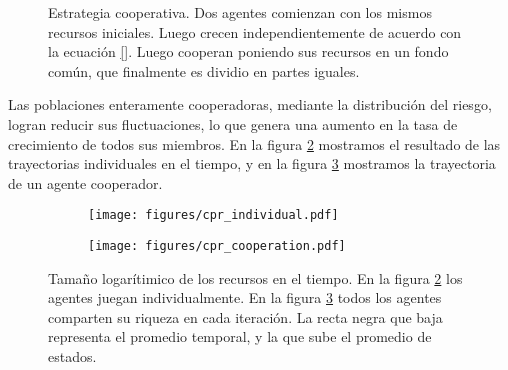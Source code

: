 \documentclass[a4paper,10pt]{article}
\begin{document}
\begin{figure}[H]
\centering
{}
\caption{Estrategia cooperativa. Dos agentes comienzan con los mismos recursos iniciales. Luego crecen independientemente de acuerdo con la ecuaci\'on \ref{}. Luego cooperan poniendo sus recursos en un fondo común, que finalmente es dividio en partes iguales.}
\label{fig:protocolo}
\end{figure}

Las poblaciones enteramente cooperadoras, mediante la distribución del riesgo, logran reducir sus fluctuaciones, lo que genera una aumento en la tasa de crecimiento de todos sus miembros.
En la figura \ref{fig:cpr_individual} mostramos el resultado de las trayectorias individuales en el tiempo, y en la figura \ref{fig:cpr_cooperation} mostramos la trayectoria de un agente cooperador.
\begin{figure}[ht!]
    \centering
    \begin{subfigure}[b]{0.45\textwidth}
    \texttt{[image: figures/cpr\_individual.pdf]}
    \caption{}
    \label{fig:cpr_individual}
    \end{subfigure}
    \begin{subfigure}[b]{0.45\textwidth}
    \texttt{[image: figures/cpr\_cooperation.pdf]}
    \caption{}
    \label{fig:cpr_cooperation}
    \end{subfigure}
    \caption{
    Tamaño logarítimico de los recursos en el tiempo.
    En la figura \ref{fig:cpr_individual} los agentes juegan individualmente.
    En la figura \ref{fig:cpr_cooperation} todos los agentes comparten su riqueza en cada iteración.
    La recta negra que baja representa el promedio temporal, y la que sube el promedio de estados.
    }
    \label{fig:gamble}
\end{figure}
\end{document}
